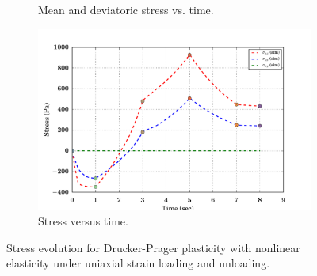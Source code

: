 \begin{figure}[htbp!]
\begin{subfigure}{0.5\textwidth}
    \caption{Mean and deviatoric stress vs. time.}
  \end{subfigure}
  \begin{subfigure}{0.5\textwidth}
    \centering
    \includegraphics[width=\textwidth]{MPMMaterials/FIGS/UniaxialStrainLoadUnloadNonLinDPNonLin_sigma_time.pdf}
    \caption{Stress versus time.}
  \end{subfigure}
  \caption{Stress evolution for Drucker-Prager plasticity with nonlinear elasticity under uniaxial strain
           loading and unloading.}
  \label{fig:NonLinDPNonLinLoadUnload}
\end{figure}
